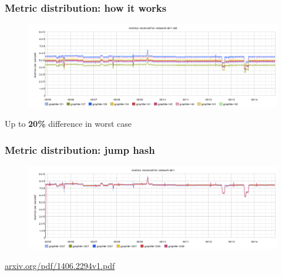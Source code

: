 \documentclass[aspectratio=43, unicode, notheorems, xcolor={dvipsnames}]{beamer}
\newcommand{\bs}[1]{\textbf{\textcolor{BookingBlue}{#1}}}
\begin{document}
\begin{frame}
	\frametitle{Metric distribution: how it works}
	\begin{figure}[h]
		\begin{center}
			\includegraphics[width=1.05\columnwidth]{graphite-old-hash}
		\end{center}
	\end{figure}
	\Large{
	Up to \bs{20\%} difference in worst case
	}
\end{frame}

\begin{frame}
	\frametitle{Metric distribution: jump hash}
	\begin{figure}[h]
		\begin{center}
			\includegraphics[width=1.05\columnwidth]{graphite-jump-hash}
		\end{center}
	\end{figure}

	\href{https://arxiv.org/pdf/1406.2294v1.pdf}{arxiv.org/pdf/1406.2294v1.pdf}
\end{frame}
\end{document}
